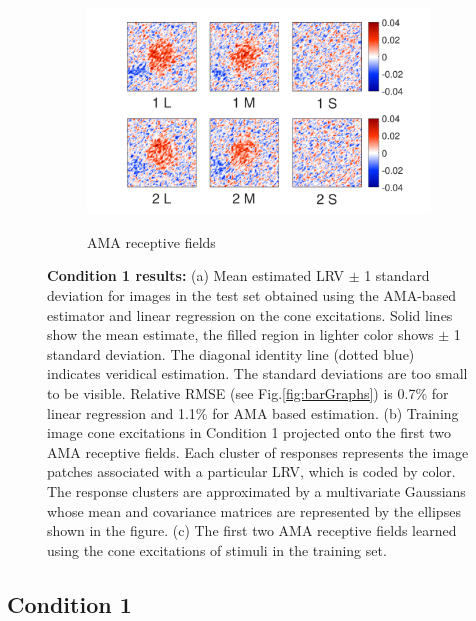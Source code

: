 \documentclass{jov}
\begin{document}
\begin{figure}
\begin{subfigure}[b]{0.26 \textwidth}
        \label{fig:case1RFResponse}
    \end{subfigure}
    \begin{subfigure}[b]{0.4 \textwidth}
	\caption{AMA receptive fields}
	\includegraphics[width=1.0\textwidth, trim={0.2cm -0.cm 0 0.3cm}]{../FiguresDraft5/Figure10/Figure10_c.pdf}
	\label{fig:case1RFs}
    \end{subfigure}   
    \caption{{\bf Condition 1 results:} (a) Mean estimated LRV $\pm$ 1 standard deviation for images in the test set obtained using the AMA-based estimator and linear regression on the cone excitations. Solid lines show the mean estimate, the filled region in lighter color shows $\pm$ 1 standard deviation. The diagonal identity line (dotted blue) indicates veridical estimation. The standard deviations are too small to be visible. Relative RMSE (see Fig.\ref{fig:barGraphs}) is 0.7\% for linear regression and 1.1\%  for AMA based estimation. (b) Training image cone excitations in Condition 1 projected onto the first two AMA receptive fields. Each cluster of responses represents the image patches associated with a particular LRV, which is coded by color. The response clusters are approximated by a multivariate Gaussians whose mean and covariance matrices are represented by the ellipses shown in the figure. (c) The first two AMA receptive fields learned using the cone excitations of stimuli in the training set.}
\label{fig:Condition1}
\end{figure}

\subsection{Condition 1}
\end{document}
